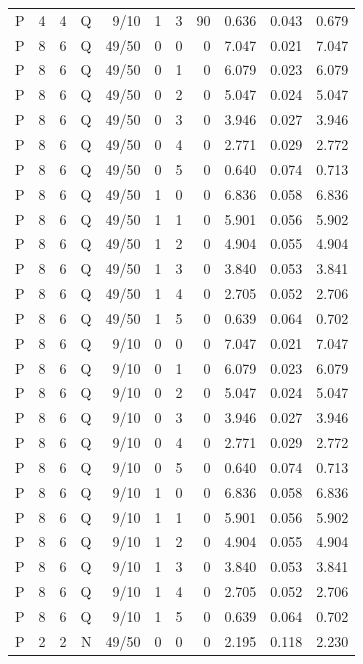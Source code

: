\begin{longtable}{rrrrrrrrrrr}
P & 4 & 4 & Q & 9/10 & 1 & 3 & 90 & 0.636 & 0.043 & 0.679 \\
P & 8 & 6 & Q & 49/50 & 0 & 0 & 0 & 7.047 & 0.021 & 7.047 \\
P & 8 & 6 & Q & 49/50 & 0 & 1 & 0 & 6.079 & 0.023 & 6.079 \\
P & 8 & 6 & Q & 49/50 & 0 & 2 & 0 & 5.047 & 0.024 & 5.047 \\
P & 8 & 6 & Q & 49/50 & 0 & 3 & 0 & 3.946 & 0.027 & 3.946 \\
P & 8 & 6 & Q & 49/50 & 0 & 4 & 0 & 2.771 & 0.029 & 2.772 \\
P & 8 & 6 & Q & 49/50 & 0 & 5 & 0 & 0.640 & 0.074 & 0.713 \\
P & 8 & 6 & Q & 49/50 & 1 & 0 & 0 & 6.836 & 0.058 & 6.836 \\
P & 8 & 6 & Q & 49/50 & 1 & 1 & 0 & 5.901 & 0.056 & 5.902 \\
P & 8 & 6 & Q & 49/50 & 1 & 2 & 0 & 4.904 & 0.055 & 4.904 \\
P & 8 & 6 & Q & 49/50 & 1 & 3 & 0 & 3.840 & 0.053 & 3.841 \\
P & 8 & 6 & Q & 49/50 & 1 & 4 & 0 & 2.705 & 0.052 & 2.706 \\
P & 8 & 6 & Q & 49/50 & 1 & 5 & 0 & 0.639 & 0.064 & 0.702 \\
P & 8 & 6 & Q & 9/10 & 0 & 0 & 0 & 7.047 & 0.021 & 7.047 \\
P & 8 & 6 & Q & 9/10 & 0 & 1 & 0 & 6.079 & 0.023 & 6.079 \\
P & 8 & 6 & Q & 9/10 & 0 & 2 & 0 & 5.047 & 0.024 & 5.047 \\
P & 8 & 6 & Q & 9/10 & 0 & 3 & 0 & 3.946 & 0.027 & 3.946 \\
P & 8 & 6 & Q & 9/10 & 0 & 4 & 0 & 2.771 & 0.029 & 2.772 \\
P & 8 & 6 & Q & 9/10 & 0 & 5 & 0 & 0.640 & 0.074 & 0.713 \\
P & 8 & 6 & Q & 9/10 & 1 & 0 & 0 & 6.836 & 0.058 & 6.836 \\
P & 8 & 6 & Q & 9/10 & 1 & 1 & 0 & 5.901 & 0.056 & 5.902 \\
P & 8 & 6 & Q & 9/10 & 1 & 2 & 0 & 4.904 & 0.055 & 4.904 \\
P & 8 & 6 & Q & 9/10 & 1 & 3 & 0 & 3.840 & 0.053 & 3.841 \\
P & 8 & 6 & Q & 9/10 & 1 & 4 & 0 & 2.705 & 0.052 & 2.706 \\
P & 8 & 6 & Q & 9/10 & 1 & 5 & 0 & 0.639 & 0.064 & 0.702 \\
P & 2 & 2 & N & 49/50 & 0 & 0 & 0 & 2.195 & 0.118 & 2.230 \\

\end{longtable}
